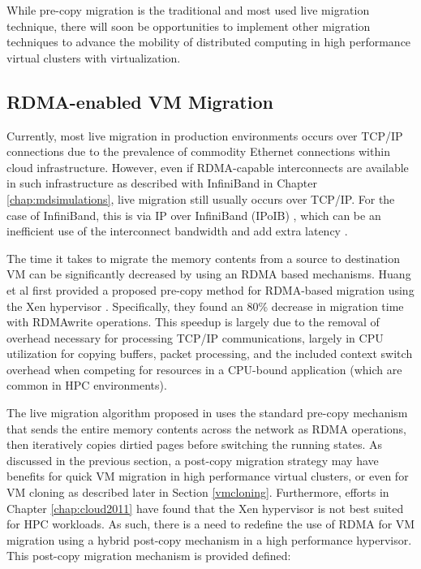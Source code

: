 While pre-copy migration is the traditional and most used live migration technique, there will soon be opportunities to implement other migration techniques to advance the mobility of distributed computing in high performance virtual clusters with virtualization. 



\subsection{RDMA-enabled VM Migration}

Currently, most live migration in production environments occurs over TCP/IP connections due to the prevalence of commodity Ethernet connections within cloud infrastructure. However, even if RDMA-capable interconnects are available in such infrastructure as described with InfiniBand in Chapter \ref{chap:mdsimulations}, live migration still usually occurs over TCP/IP. For the case of InfiniBand, this is via IP over InfiniBand (IPoIB) \cite{chu2006ipoib}, which can be an inefficient use of the interconnect bandwidth and add extra latency \cite{yu2008performance}. 

The time it takes to migrate the memory contents from a source to destination VM can be significantly decreased by using an RDMA based mechanisms. Huang et al first provided a proposed pre-copy method for RDMA-based migration using the Xen hypervisor \cite{huang2007high}. Specifically, they found an 80\% decrease in migration time with RDMAwrite operations. This speedup is largely due to the removal of overhead necessary for processing TCP/IP communications, largely in CPU utilization for copying buffers, packet processing, and the included context switch overhead when competing for resources in a CPU-bound application (which are common in HPC environments). 

The live migration algorithm proposed in \cite{huang2007high} uses the standard pre-copy mechanism that sends the entire memory contents across the network as RDMA operations, then iteratively copies dirtied pages before switching the running states.  As discussed in the previous section, a post-copy migration strategy may have benefits for quick VM migration in high performance virtual clusters, or even for VM cloning as described later in Section \ref{vmcloning}. Furthermore, efforts in Chapter \ref{chap:cloud2011} have found that the Xen hypervisor is not best suited for HPC workloads.  As such, there is a need to redefine the use of RDMA for VM migration using a hybrid post-copy mechanism in a high performance hypervisor. This post-copy migration mechanism is provided defined:

